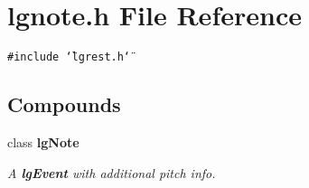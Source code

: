 \section{lgnote.h File Reference}
\label{lgnote_8h}
{\tt \#include \char`\"{}lgrest.h\char`\"{}}\par
\subsection*{Compounds}
\begin{CompactItemize}
\item 
class {\bf lg\-Note}
\begin{CompactList}\small\item\em A {\bf lg\-Event} with additional pitch info. \item\end{CompactList}\end{CompactItemize}
